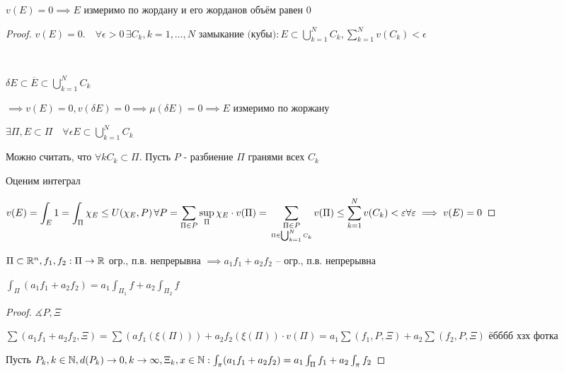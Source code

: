     $v(E) = 0 \implies E$ измеримо по жордану и его жорданов объём равен 0
    \begin{proof}
        $\displaystyle v(E) = 0. \quad\forall \epsilon > 0 \, \exists C_k, k=1,\dotsc,N \text{ замыкание (кубы)}:
        E \subset \bigcup^N_{k=1} C_k, \sum^N_{k=1} v(C_k) < \epsilon
        $

        \par $ $

        $\delta E \subset \overline{E} \subset \bigcup^N_{k=1} C_k$

        $\implies v(E) = 0, v(\delta E) = 0 \implies \mu(\delta E) = 0 \implies E$ 
        измеримо по жоржану
        
        $\exists \Pi, E \subset \Pi \quad \forall \epsilon E \subset \bigcup^N_{k=1}C_k$

        Можно считать, что $\forall k C_k \subset \Pi$. Пусть $P$ - разбиение $\Pi$ гранями
        всех $C_k$

        Оценим интеграл 
        
        $\displaystyle v(E) = \int_E 1 = \int_\Pi \chi_E \le 
        U(\chi_E, P) \, \forall P = 
        \sum_{\Pi \in P} \sup_\Pi \chi_E \cdot v(\Pi)
        = \\\sum_{\underset{\Pi \in \bigcup^N_{k=1}C_k}{\Pi \in P}} v(\Pi) \le \sum^N_{k=1} v(C_k) < \epsilon \forall \epsilon\\
        \implies v(E) = 0
        $
    \end{proof}

    \begin{lemma}
        $\Pi \subset \R^n, f_1 ,f_2: \Pi \to \R$ огр., п.в. непрерывна
        $\implies a_1f_1 + a_2f_2$ -- огр., п.в. непрерывна

        $\int_\Pi(a_1f_1 + a_2f_2) = a_1\int_{\Pi_1} f + a_2\int_{\Pi_2}f$
    \end{lemma}

    \begin{proof}
        $\measuredangle P, \Xi$ 

        $\sum(a_1f_1 + a_2f_2, \Xi) = \sum(af_1(\xi (\Pi)) ) + a_2f_2(\xi(\Pi)) \cdot v(\Pi) =
        a_1 \sum(f_1, P, \Xi) + a_2 \sum (f_2, P, \Xi)
        $ ёбббб хзх фотка 

        Пусть $P_k, k \in \N, d(P_k) \to 0, k \to \infty, \Xi_k, x \in \N: 
        \int_\pi(a_1f_1 + a_2f_2) = a_1\int_\Pi f_1 + a_2\int_\pi f_2
        $
    \end{proof}

